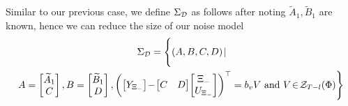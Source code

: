Similar to our previous case, we define $\Sigma_{\mathcal{D}}$ as follows after noting $\widetilde{A}_1, \widetilde{B}_1$ are known, hence we can reduce the size of our noise model 
\begin{multline}\label{ch5:def:SigmaD}
\Sigma_{\calD} =  \Biggl\{ (A,B,C,D) \! \mid \!\\
A = \bbm \widetilde{A}_1\\C\ebm, B = \bbm \widetilde{B}_1\\D\ebm, \left(\begin{bmatrix} Y_{\Xi_-}  \end{bmatrix} \!-\! \begin{bmatrix}
C&D\end{bmatrix}\!\begin{bmatrix}\Xi_-\\ U_{\Xi_-}  \end{bmatrix}\right)^\top = b_v V \text{ and } V\!\in\!\calZ_{T-l}(\Phi)\Biggr\}
\end{multline}

